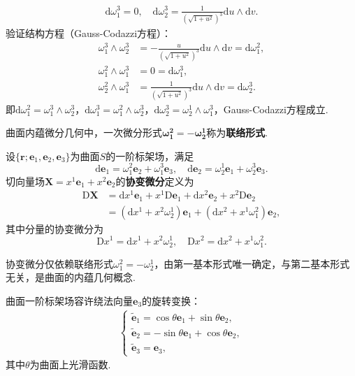 \documentclass[../../main.tex]{subfiles}%
\begin{document}
\begin{example}
\begin{solution}
\begin{align*}
\mathrm{d}\omega_1^3 = 0, \quad
\mathrm{d}\omega_2^3 = \frac{1}{(\sqrt{1+u^2})^3}\mathrm{d}u\land\mathrm{d}v.
\end{align*}
验证结构方程（Gauss-Codazzi方程）：
\begin{align*}
\omega_1^3\land\omega_2^3 &= -\frac{u}{(\sqrt{1+u^2})^3}\mathrm{d}u\land\mathrm{d}v = \mathrm{d}\omega_1^2, \\
\omega_1^2\land\omega_1^3 &= 0 = \mathrm{d}\omega_1^3, \\
\omega_2^2\land\omega_1^3 &= \frac{1}{(\sqrt{1+u^2})^3}\mathrm{d}u\land\mathrm{d}v = \mathrm{d}\omega_2^3.
\end{align*}
即$\mathrm{d}\omega_1^2=\omega_1^3\land\omega_2^3$，$\mathrm{d}\omega_1^3=\omega_1^2\land\omega_2^3$，$\mathrm{d}\omega_2^3=\omega_2^1\land\omega_1^3$，Gauss-Codazzi方程成立.

\end{solution}
\end{example}

\begin{definition}
曲面内蕴微分几何中，一次微分形式$\boldsymbol{\omega_1^2=-\omega_2^1}$称为\textbf{联络形式}.
\end{definition}

\begin{definition}
设$\{\boldsymbol{r};\boldsymbol{e}_1,\boldsymbol{e}_2,\boldsymbol{e}_3\}$为曲面$S$的一阶标架场，满足
$$\mathrm{d}\boldsymbol{e}_1=\omega_1^2\boldsymbol{e}_2+\omega_1^3\boldsymbol{e}_3,\quad \mathrm{d}\boldsymbol{e}_2=\omega_2^1\boldsymbol{e}_1+\omega_2^3\boldsymbol{e}_3.$$
切向量场$\boldsymbol{X}=x^1\boldsymbol{e}_1+x^2\boldsymbol{e}_2$的\textbf{协变微分}定义为
\begin{align*}
\mathrm{D}\boldsymbol{X} &= \mathrm{d}x^1\boldsymbol{e}_1 + x^1\mathrm{D}\boldsymbol{e}_1 + \mathrm{d}x^2\boldsymbol{e}_2 + x^2\mathrm{D}\boldsymbol{e}_2 \\
&= (\mathrm{d}x^1 + x^2\omega_2^1)\boldsymbol{e}_1 + (\mathrm{d}x^2 + x^1\omega_1^2)\boldsymbol{e}_2,
\end{align*}
其中分量的协变微分为
$$\mathrm{D}x^1 = \mathrm{d}x^1 + x^2\omega_2^1,\quad \mathrm{D}x^2 = \mathrm{d}x^2 + x^1\omega_1^2.$$
\end{definition}

\begin{remark}
协变微分仅依赖联络形式$\omega_1^2=-\omega_2^1$，由第一基本形式唯一确定，与第二基本形式无关，是曲面的内蕴几何概念.
\end{remark}

曲面一阶标架场容许绕法向量$\boldsymbol{e}_3$的旋转变换：
\begin{align}
\begin{cases}
\tilde{\boldsymbol{e}}_1 = \cos\theta\boldsymbol{e}_1 + \sin\theta\boldsymbol{e}_2, \\
\tilde{\boldsymbol{e}}_2 = -\sin\theta\boldsymbol{e}_1 + \cos\theta\boldsymbol{e}_2, \\
\tilde{\boldsymbol{e}}_3 = \boldsymbol{e}_3,
\end{cases} \label{eq:frame_trans}
\end{align}
其中$\theta$为曲面上光滑函数.
\end{document}
